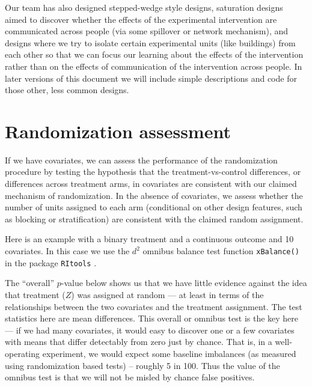\documentclass[
  12pt,
]{book}
\newenvironment{Shaded}{\begin{snugshade}}{\end{snugshade}}
\newcommand{\AttributeTok}[1]{\textcolor[rgb]{0.77,0.63,0.00}{#1}}
\newcommand{\FunctionTok}[1]{\textcolor[rgb]{0.00,0.00,0.00}{#1}}
\newcommand{\NormalTok}[1]{#1}
\newcommand{\OtherTok}[1]{\textcolor[rgb]{0.56,0.35,0.01}{#1}}
\newcommand{\SpecialCharTok}[1]{\textcolor[rgb]{0.00,0.00,0.00}{#1}}
\theoremstyle{definition}
\theoremstyle{definition}
\theoremstyle{definition}
\theoremstyle{remark}
\begin{document}
Our team has also designed stepped-wedge style designs, saturation
designs aimed to discover whether the effects of the experimental
intervention are communicated across people (via some spillover or
network mechanism), and designs where we try to isolate certain
experimental units (like buildings) from each other so that we can focus
our learning about the effects of the intervention rather than on the
effects of communication of the intervention across people. In later
versions of this document we will include simple descriptions and code
for those other, less common designs.

\hypertarget{randomization-assessment}{%
\section{Randomization assessment}\label{randomization-assessment}}

If we have covariates, we can assess the performance of the
randomization procedure by testing the hypothesis that the
treatment-vs-control differences, or differences across treatment arms,
in covariates are consistent with our claimed mechanism of
randomization. In the absence of covariates, we assess whether the
number of units assigned to each arm (conditional on other design
features, such as blocking or stratification) are consistent with the
claimed random assignment.

Here is an example with a binary treatment and a continuous outcome and
10 covariates. In this case we use the \(d^2\) omnibus balance test
function \texttt{xBalance()} in the package \texttt{RItools}
\citetext{\citealp[see][
]{hansen_covariate_2008}; \citealp{bowers_ritools_2016}}.

The ``overall'' \(p\)-value below shows us that we have little evidence
against the idea that treatment (\(Z\)) was assigned at random --- at
least in terms of the relationships between the two covariates and the
treatment assignment. The test statistics here are mean differences.
This overall or omnibus test is the key here --- if we had many
covariates, it would easy to discover one or a few covariates with means
that differ detectably from zero just by chance. That is, in a
well-operating experiment, we would expect some baseline imbalances (as
measured using randomization based tests) -- roughly 5 in 100. Thus the
value of the omnibus test is that we will not be misled by chance false
positives.

\begin{Shaded}
\end{Shaded}
\end{document}
